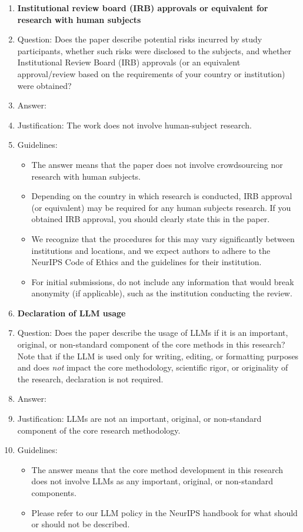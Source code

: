 \documentclass{article}
\begin{document}
\begin{enumerate}
\item {\bf Institutional review board (IRB) approvals or equivalent for research with human subjects}
    \item[] Question: Does the paper describe potential risks incurred by study participants, whether such risks were disclosed to the subjects, and whether Institutional Review Board (IRB) approvals (or an equivalent approval/review based on the requirements of your country or institution) were obtained?
    \item[] Answer: \answerNA{} %
    \item[] Justification: The work does not involve human-subject research.
    \item[] Guidelines:
    \begin{itemize}
        \item The answer \answerNA{} means that the paper does not involve crowdsourcing nor research with human subjects.
        \item Depending on the country in which research is conducted, IRB approval (or equivalent) may be required for any human subjects research. If you obtained IRB approval, you should clearly state this in the paper. 
        \item We recognize that the procedures for this may vary significantly between institutions and locations, and we expect authors to adhere to the NeurIPS Code of Ethics and the guidelines for their institution. 
        \item For initial submissions, do not include any information that would break anonymity (if applicable), such as the institution conducting the review.
    \end{itemize}

\item {\bf Declaration of LLM usage}
    \item[] Question: Does the paper describe the usage of LLMs if it is an important, original, or non-standard component of the core methods in this research? Note that if the LLM is used only for writing, editing, or formatting purposes and does \emph{not} impact the core methodology, scientific rigor, or originality of the research, declaration is not required.
    \item[] Answer: \answerNA{} %
    \item[] Justification: LLMs are not an important, original, or non-standard component of the core research methodology.
    \item[] Guidelines:
    \begin{itemize}
        \item The answer \answerNA{} means that the core method development in this research does not involve LLMs as any important, original, or non-standard components.
        \item Please refer to our LLM policy in the NeurIPS handbook for what should or should not be described.
    \end{itemize}

\end{enumerate}
\end{document}
